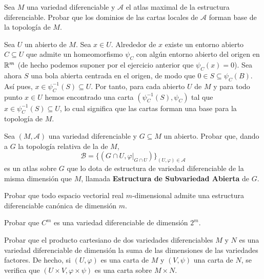 \documentclass[twoside]{article}
\begin{document}
\begin{ejercicio}{3}
Sea $M$ una variedad diferenciable y $\mathcal{A}$ el atlas maximal de la estructura
diferenciable. Probar que los dominios de las cartas locales de $\mathcal{A}$ forman
base de la topología de $M$.
\end{ejercicio}
\begin{solucion}
Sea $U$ un abierto de $M$. Sea $x\in U$. Alrededor de $x$ existe un entorno abierto $C\subseteq U$ que admite un homeomorfismo $\psi_C$ con algún entorno abierto del origen en $\mathbb{R}^m$ (de hecho podemos suponer por el ejercicio anterior que $\psi_C(x)=0$). Sea ahora $S$ una bola abierta centrada en el origen, de modo que $0\in S\subseteq \psi_C(B)$. Así pues, $x\in\psi_C^{-1}(S)\subseteq U$. Por tanto, para cada abierto $U$ de $M$ y para todo punto $x\in U$ hemos encontrado una carta $(\psi_C^{-1}(S),\psi_C)$ tal que $x\in\psi_C^{-1}(S)\subseteq U$, lo cual significa que las cartas forman una base para la topología de $M$.
\end{solucion}

\begin{ejercicio}{4}
Sea $(M,\mathcal{A})$ una variedad diferenciable y $G\subseteq M$ un abierto. Probar que,
dando a $G$ la topología relativa de la de $M$,
$$\mathcal{B} = \{(G \cap U, \varphi|_{G\cap U})\}_{(U,\varphi)\in\mathcal{A}}$$
es un atlas sobre $G$ que lo dota de estructura de variedad diferenciable de la
misma dimensión que $M$, llamada \textbf{Estructura de Subvariedad Abierta}
de $G$.
\end{ejercicio}
\begin{solucion}
\end{solucion}

\begin{ejercicio}{5}
Probar que todo espacio vectorial real $m$-dimensional admite una estructura
diferenciable canónica de dimensión $m$.
\end{ejercicio}
\begin{solucion}
\end{solucion}

\begin{ejercicio}{6}
Probar que $C^m$ es una variedad diferenciable de dimensión $2^m$.
\end{ejercicio}
\begin{solucion}
\end{solucion}

\begin{ejercicio}{7}
Probar que el producto cartesiano de dos variedades diferenciables $M$ y $N$
es una variedad diferenciable de dimensión la suma de las dimensiones de
las variedades factores. De hecho, si $(U,\varphi)$ es una carta de $M$ y $(V,\psi )$ una
carta de $N$, se verifica que $(U \times V,\varphi\times\psi )$ es una carta sobre $M \times N$.
\end{ejercicio}
\begin{solucion}
\end{solucion}
\end{document}
